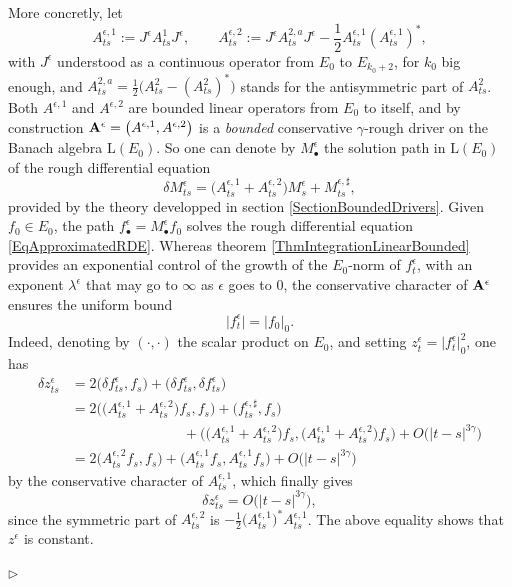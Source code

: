 \documentclass[11pt,a4paper]{amsart}
\numberwithin{equation}{section} %
\newenvironment{Dem}{%
    \begin{list}{\hspace{0.5cm}{\sc Proof --}}{%
        \setlength{\topsep}{0pt}%
        \setlength{\leftmargin}{0pt}%
        \setlength{\rightmargin}{0pt}%
        \setlength{\listparindent}{0pt}%
        \setlength{\itemindent}{0pt}%
        \setlength{\parsep}{0pt}%
        \addtolength{\leftmargin}{20pt}%
        \addtolength{\rightmargin}{0pt}%
    } \item }{\hfill{\space $\rhd$}\end{list}\smallskip}
\begin{document}
\begin{Dem}
More concretly, let 
$$
A^{\epsilon,1}_{ts} := J^\epsilon A^1_{ts}J^\epsilon,\quad\quad A^{\epsilon,2}_{ts} := J^\epsilon A^{2,a}_{ts}J^\epsilon - \frac1 2 A^{\epsilon,1}_{ts} (A^{\epsilon,1}_{ts})^*,
$$
with $J^\epsilon$ understood as a continuous operator from $E_0$ to $E_{k_0+2}$, for $k_0$ big enough, and $A^{2,a}_{ts} = \frac{1}{2}\big(A^2_{ts}-(A^2_{ts})^*\big)$ stands for the antisymmetric part of $A^{2}_{ts}$. Both $A^{\epsilon,1}$ and $A^{\epsilon,2}$ are bounded linear operators from $E_0$ to itself, and by construction ${\bf A}^\epsilon = \big(A^{\epsilon,1},A^{\epsilon,2}\big)$ is a \emph{bounded} conservative $\gamma$-rough driver on the Banach algebra $\textrm{L}(E_0)$. So one can denote by $M^\epsilon_\bullet$ the solution path in $\textrm{L}(E_0)$ of the rough differential equation
$$
\delta M^\epsilon_{ts} = \Big(A^{\epsilon,1}_{ts} + A^{\epsilon,2}_{ts}\Big)M^\epsilon_s + M^{\epsilon,\sharp}_{ts},
$$
provided by the theory developped in section \ref{SectionBoundedDrivers}. Given $f_0\in E_0$, the path $f^\epsilon_\bullet = M^\epsilon_\bullet f_0$ solves the rough differential equation \eqref{EqApproximatedRDE}. Whereas theorem \ref{ThmIntegrationLinearBounded} provides an exponential control of the growth of the $E_0$-norm of $f^\epsilon_t$, with an exponent $\lambda^\epsilon$ that may go to $\infty$ as $\epsilon$ goes to $0$, the conservative character of ${\bf A}^\epsilon$ ensures the uniform bound
\begin{equation*}
\big| f^\epsilon_t\big| = \big| f_0\big|_0.
\end{equation*}
Indeed, denoting by $(\cdot,\cdot)$ the scalar product on $E_0$, and setting $z^\epsilon_t = \big|f^\epsilon_t\big|^2_0$, one has
\begin{equation*}
\begin{split}
\delta z^\epsilon_{ts} &= 2\big(\delta f^\epsilon_{ts},f_s\big) + \big(\delta f^\epsilon_{ts}, \delta f^\epsilon_{ts}\big) \\
                                    &= 2\Big(\big(A^{\epsilon,1}_{ts}+A^{\epsilon,2}_{ts}\big)f_s , f_s\Big) + \big(f^{\epsilon,\sharp}_{ts},f_s\big) \\
                                    &\quad\quad\quad\quad\quad\quad\quad\quad+ \Big(\big(A^{\epsilon,1}_{ts}+A^{\epsilon,2}_{ts}\big)f_s , \big(A^{\epsilon,1}_{ts}+A^{\epsilon,2}_{ts}\big)f_s\Big) + O\big(|t-s|^{3\gamma}\big) \\
                                    &= 2\Big(A^{\epsilon,2}_{ts}f_s , f_s\Big) + \Big(A^{\epsilon,1}_{ts}f_s , A^{\epsilon,1}_{ts}f_s\Big) + O\big(|t-s|^{3\gamma}\big)
\end{split}
\end{equation*} 
by the conservative character of $A^{\epsilon,1}_{ts}$, which finally gives
$$
\delta z^\epsilon_{ts} = O\big(|t-s|^{3\gamma}\big),
$$
since the symmetric part of $A^{\epsilon,2}_{ts}$ is $-\frac{1}{2}\big(A^{\epsilon,1}_{ts}\big)^*A^{\epsilon,1}_{ts}$. The above equality shows that $z^\epsilon$ is constant.


\end{Dem}
\end{document}
